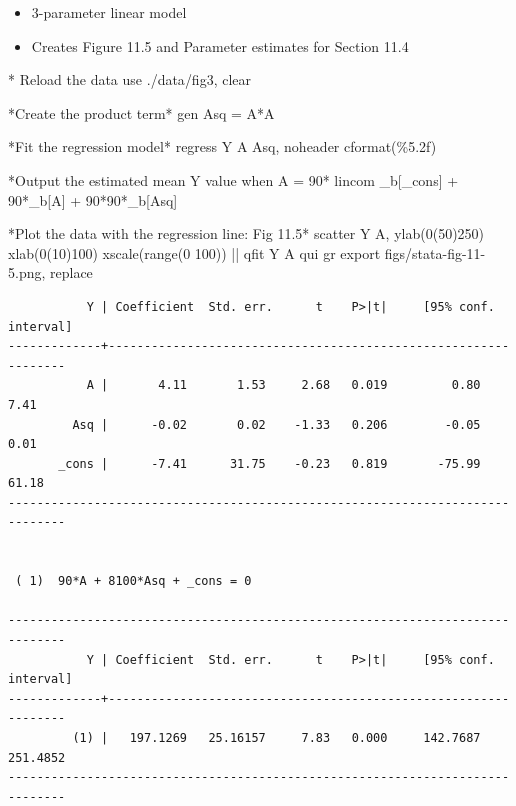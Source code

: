 \documentclass[
  10pt,
  a4paper,
]{book}
\newenvironment{Shaded}{\begin{snugshade}}{\end{snugshade}}
\newcommand{\BaseNTok}[1]{\textcolor[rgb]{0.68,0.00,0.00}{#1}}
\newcommand{\DataTypeTok}[1]{\textcolor[rgb]{0.68,0.00,0.00}{#1}}
\newcommand{\KeywordTok}[1]{\textcolor[rgb]{0.00,0.46,0.62}{#1}}
\newcommand{\NormalTok}[1]{\textcolor[rgb]{0.00,0.46,0.62}{#1}}
\newcommand{\OtherTok}[1]{\textcolor[rgb]{0.00,0.46,0.62}{#1}}
\providecommand{\tightlist}{%
  \setlength{\itemsep}{0pt}\setlength{\parskip}{0pt}}
\begin{document}
\begin{itemize}
\tightlist
\item
  3-parameter linear model
\item
  Creates Figure 11.5 and Parameter estimates for Section 11.4
\end{itemize}

\begin{Shaded}
\begin{Highlighting}[]
\NormalTok{* Reload the }\KeywordTok{data}
\KeywordTok{use}\NormalTok{ ./}\KeywordTok{data}\NormalTok{/fig3, }\KeywordTok{clear}

\NormalTok{*Create the product term*}
\KeywordTok{gen}\NormalTok{ Asq = A*A}

\NormalTok{*Fit the regression }\KeywordTok{model}\NormalTok{*}
\KeywordTok{regress}\NormalTok{ Y A Asq, }\KeywordTok{noheader}\NormalTok{ cformat(\%5.2f)}

\NormalTok{*Output the estimated }\KeywordTok{mean}\NormalTok{ Y }\OtherTok{value}\NormalTok{ when A = 90*}
\KeywordTok{lincom}\NormalTok{ \_b[}\DataTypeTok{\_cons}\NormalTok{] + 90*\_b[A] + 90*90*\_b[Asq]}

\NormalTok{*Plot the }\KeywordTok{data}\NormalTok{ with the regression }\KeywordTok{line}\NormalTok{: Fig 11.5*}
\KeywordTok{scatter}\NormalTok{ Y A, ylab(0(50)250) xlab(0(10)100) }\BaseNTok{xscale}\NormalTok{(}\KeywordTok{range}\NormalTok{(0 100)) || qfit Y A}
\KeywordTok{qui} \KeywordTok{gr} \KeywordTok{export}\NormalTok{ figs/stata{-}fig{-}11{-}5.png, }\KeywordTok{replace}
\end{Highlighting}
\end{Shaded}

\begin{verbatim}
           Y | Coefficient  Std. err.      t    P>|t|     [95% conf. interval]
-------------+----------------------------------------------------------------
           A |       4.11       1.53     2.68   0.019         0.80        7.41
         Asq |      -0.02       0.02    -1.33   0.206        -0.05        0.01
       _cons |      -7.41      31.75    -0.23   0.819       -75.99       61.18
------------------------------------------------------------------------------


 ( 1)  90*A + 8100*Asq + _cons = 0

------------------------------------------------------------------------------
           Y | Coefficient  Std. err.      t    P>|t|     [95% conf. interval]
-------------+----------------------------------------------------------------
         (1) |   197.1269   25.16157     7.83   0.000     142.7687    251.4852
------------------------------------------------------------------------------
\end{verbatim}
\end{document}
